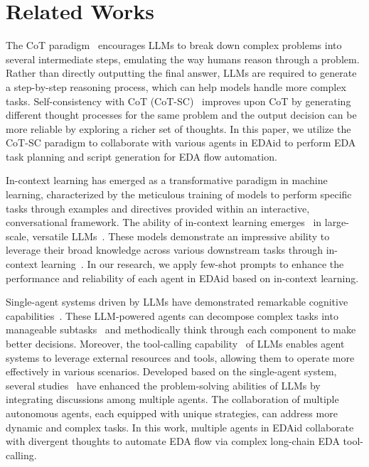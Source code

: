 \section{Related Works}

The CoT paradigm~\cite{wei2022cot} encourages LLMs to break down complex problems into several intermediate steps, emulating the way humans reason through a problem. 
Rather than directly outputting the final answer, LLMs are required to generate a step-by-step reasoning process, which can help models handle more complex tasks.
Self-consistency with CoT (CoT-SC)~\cite{wang2022selfcon} improves upon CoT by generating different thought processes for the same problem and the output decision can be more reliable by exploring a richer set of thoughts.
In this paper, we utilize the CoT-SC paradigm to collaborate with various agents in EDAid to perform EDA task planning and script generation for EDA flow automation. 

In-context learning \cite{min2022metaicl} has emerged as a transformative paradigm in machine learning, characterized by the meticulous training of models to perform specific tasks through examples and directives provided within an interactive, conversational framework. 
The ability of in-context learning emerges~\cite{wei2022emergent} in large-scale, versatile LLMs~\cite{openai2023gpt4, 2024claude, dubey2024llama3}. 
These models demonstrate an impressive ability to leverage their broad knowledge across various downstream tasks through in-context learning~\cite{brown2020gpt3}.  
In our research, we apply few-shot prompts to enhance the performance and reliability of each agent in EDAid based on in-context learning.

Single-agent systems driven by LLMs have demonstrated remarkable cognitive capabilities~\cite{sumers2023cognitive, wang2024agentsurvey, xi2023llmagentsurvey, wu2024chateda}. 
These LLM-powered agents can decompose complex tasks into manageable subtasks~\cite{khot2022decomposed} and methodically think through each component to make better decisions. 
Moreover, the tool-calling capability~\cite{qin2023toolllm} of LLMs enables agent systems to leverage external resources and tools, allowing them to operate more effectively in various scenarios.
Developed based on the single-agent system, several studies~\cite{hong2024metagpt, wang2023unleashing, du2023improving, hao2023chatllm} have enhanced the problem-solving abilities of LLMs by integrating discussions among multiple agents.
The collaboration of multiple autonomous agents, each equipped with unique strategies, can address more dynamic and complex tasks. 
In this work, multiple agents in EDAid collaborate with divergent thoughts to automate EDA flow via complex long-chain EDA tool-calling.
